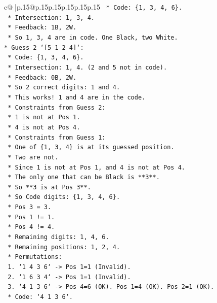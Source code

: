 \documentclass{article}
\begin{document}
{\begin{supertabular}{c@{$\;$}|p{.15\linewidth}@{}p{.15\linewidth}p{.15\linewidth}p{.15\linewidth}p{.15\linewidth}p{.15\linewidth}}
{{{\texttt{    *   Code: \{1, 3, 4, 6\}.} \\
\texttt{    *   Intersection: 1, 3, 4.} \\
\texttt{    *   Feedback: 1B, 2W.} \\
\texttt{    *   So 1, 3, 4 are in code. One Black, two White.} \\
\texttt{*   Guess 2 `{[}5 1 2 4{]}`:} \\
\texttt{    *   Code: \{1, 3, 4, 6\}.} \\
\texttt{    *   Intersection: 1, 4. (2 and 5 not in code).} \\
\texttt{    *   Feedback: 0B, 2W.} \\
\texttt{    *   So 2 correct digits: 1 and 4.} \\
\texttt{    *   This works! 1 and 4 are in the code.} \\
\texttt{    *   Constraints from Guess 2:} \\
\texttt{        *   1 is not at Pos 1.} \\
\texttt{        *   4 is not at Pos 4.} \\
\texttt{    *   Constraints from Guess 1:} \\
\texttt{        *   One of \{1, 3, 4\} is at its guessed position.} \\
\texttt{        *   Two are not.} \\
\texttt{        *   Since 1 is not at Pos 1, and 4 is not at Pos 4.} \\
\texttt{        *   The only one that can be Black is **3**.} \\
\texttt{        *   So **3 is at Pos 3**.} \\
\texttt{    *   So Code digits: \{1, 3, 4, 6\}.} \\
\texttt{    *   Pos 3 = 3.} \\
\texttt{    *   Pos 1 != 1.} \\
\texttt{    *   Pos 4 != 4.} \\
\texttt{    *   Remaining digits: 1, 4, 6.} \\
\texttt{    *   Remaining positions: 1, 2, 4.} \\
\texttt{    *   Permutations:} \\
\texttt{        1.  `1 4 3 6` {-}> Pos 1=1 (Invalid).} \\
\texttt{        2.  `1 6 3 4` {-}> Pos 1=1 (Invalid).} \\
\texttt{        3.  `4 1 3 6` {-}> Pos 4=6 (OK). Pos 1=4 (OK). Pos 2=1 (OK).} \\
\texttt{            *   Code: `4 1 3 6`.} \\
}}}
\end{supertabular}}
\end{document}
